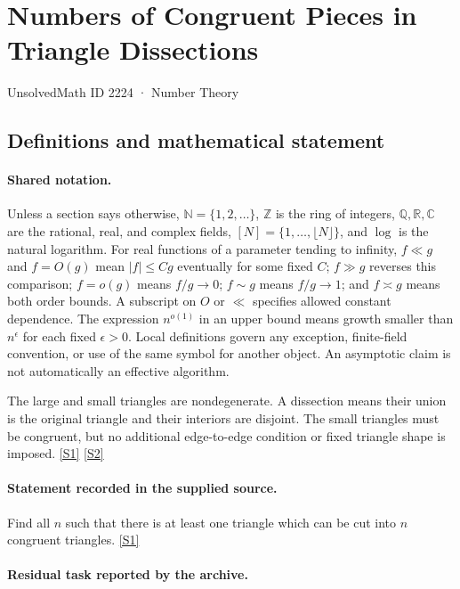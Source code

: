 \documentclass[11pt,a4paper]{article}
\newcommand{\N}{\mathbb{N}}
\newcommand{\Z}{\mathbb{Z}}
\newcommand{\Q}{\mathbb{Q}}
\newcommand{\R}{\mathbb{R}}
\newcommand{\C}{\mathbb{C}}
\newcommand{\sref}[2]{\hyperlink{source:#1:#2}{[S#2]}}
\begin{document}

\setcounter{section}{2223}

\section{Numbers of Congruent Pieces in Triangle Dissections}\label{2224}

{\small\sffamily UnsolvedMath ID 2224 · Number Theory}

\subsection{Definitions and mathematical statement}

\paragraph{Shared notation.}Unless a section says otherwise, $\N=\{1,2,\ldots\}$,
$\Z$ is the ring of integers, $\Q,\R,\C$ are the rational, real, and complex
fields, $[N]=\{1,\ldots,\lfloor N\rfloor\}$, and $\log$ is the natural
logarithm. For real functions of a parameter tending to infinity,
$f\ll g$ and $f=O(g)$ mean $|f|\leq Cg$ eventually for some fixed $C$;
$f\gg g$ reverses this comparison; $f=o(g)$ means $f/g\to0$;
$f\sim g$ means $f/g\to1$; and $f\asymp g$ means both order bounds.
A subscript on $O$ or $\ll$ specifies allowed constant dependence.
The expression $n^{o(1)}$ in an upper bound means growth smaller than
$n^\epsilon$ for each fixed $\epsilon>0$. Local definitions govern any
exception, finite-field convention, or use of the same symbol for another
object. An asymptotic claim is not automatically an effective algorithm.



The large and small triangles are nondegenerate. A dissection means their union is the original triangle and their interiors are disjoint. The small triangles must be congruent, but no additional edge-to-edge condition or fixed triangle shape is imposed. \sref{2224}{1} \sref{2224}{2}

\paragraph{Statement recorded in the supplied source.}
Find all $n$ such that there is at least one triangle which can be cut into $n$ congruent triangles. \sref{2224}{1}

\paragraph{Residual task reported by the archive.}
\end{document}
